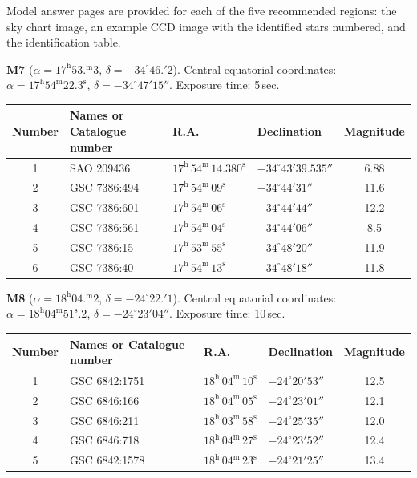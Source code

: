 Model answer pages are provided for each of the five recommended regions:
the sky chart image, an example CCD image with the identified stars
numbered, and the identification table.


\textbf{M7} ($\alpha = 17^{\mathrm{h}}53.^{\mathrm{m}}3$,
$\delta = -34^\circ 46.'2$). Central equatorial coordinates:
$\alpha = 17^{\mathrm{h}}54^{\mathrm{m}}22.3^{\mathrm{s}}$,
$\delta = -34^\circ 47' 15''$. Exposure time: 5\,sec.

\begin{center}
\begin{tabular}{clllc}
Number & Names or Catalogue number & R.A. & Declination & Magnitude \\
\hline
1 & SAO 209436 & $17^{\mathrm{h}}\,54^{\mathrm{m}}\,14.380^{\mathrm{s}}$ & $-34^\circ 43' 39.535''$ & 6.88 \\
2 & GSC 7386:494 & $17^{\mathrm{h}}\,54^{\mathrm{m}}\,09^{\mathrm{s}}$ & $-34^\circ 44' 31''$ & 11.6 \\
3 & GSC 7386:601 & $17^{\mathrm{h}}\,54^{\mathrm{m}}\,06^{\mathrm{s}}$ & $-34^\circ 44' 44''$ & 12.2 \\
4 & GSC 7386:561 & $17^{\mathrm{h}}\,54^{\mathrm{m}}\,04^{\mathrm{s}}$ & $-34^\circ 44' 06''$ & 8.5 \\
5 & GSC 7386:15 & $17^{\mathrm{h}}\,53^{\mathrm{m}}\,55^{\mathrm{s}}$ & $-34^\circ 48' 20''$ & 11.9 \\
6 & GSC 7386:40 & $17^{\mathrm{h}}\,54^{\mathrm{m}}\,13^{\mathrm{s}}$ & $-34^\circ 48' 18''$ & 11.8 \\
\end{tabular}
\end{center}

\textbf{M8} ($\alpha = 18^{\mathrm{h}}04.^{\mathrm{m}}2$,
$\delta = -24^\circ 22.'1$). Central equatorial coordinates:
$\alpha = 18^{\mathrm{h}}04^{\mathrm{m}}51^{\mathrm{s}}.2$,
$\delta = -24^\circ 23' 04''$. Exposure time: 10\,sec.

\begin{center}
\begin{tabular}{clllc}
Number & Names or Catalogue number & R.A. & Declination & Magnitude \\
\hline
1 & GSC 6842:1751 & $18^{\mathrm{h}}\,04^{\mathrm{m}}\,10^{\mathrm{s}}$ & $-24^\circ 20' 53''$ & 12.5 \\
2 & GSC 6846:166 & $18^{\mathrm{h}}\,04^{\mathrm{m}}\,05^{\mathrm{s}}$ & $-24^\circ 23' 01''$ & 12.1 \\
3 & GSC 6846:211 & $18^{\mathrm{h}}\,03^{\mathrm{m}}\,58^{\mathrm{s}}$ & $-24^\circ 25' 35''$ & 12.0 \\
4 & GSC 6846:718 & $18^{\mathrm{h}}\,04^{\mathrm{m}}\,27^{\mathrm{s}}$ & $-24^\circ 23' 52''$ & 12.4 \\
5 & GSC 6842:1578 & $18^{\mathrm{h}}\,04^{\mathrm{m}}\,23^{\mathrm{s}}$ & $-24^\circ 21' 25''$ & 13.4 \\
\end{tabular}
\end{center}


